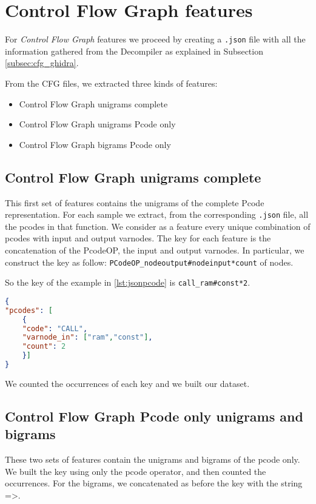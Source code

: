 \section{Control Flow Graph features}
For \textit{Control Flow Graph} features we proceed by creating a \texttt{.json} file with all the information gathered from the Decompiler as explained in Subsection \ref{subsec:cfg_ghidra}.

From the CFG files, we extracted three kinds of features:
\begin{itemize}
	\item {Control Flow Graph unigrams complete}
	\item {Control Flow Graph unigrams Pcode only}
	\item {Control Flow Graph bigrams Pcode only}
\end{itemize}

\subsection{Control Flow Graph unigrams complete}
This first set of features contains the unigrams of the complete Pcode representation.
For each sample we extract, from the corresponding \texttt{.json} file, all the pcodes in that function. We consider as a feature every unique combination of pcodes with input and output varnodes.
The key for each feature is the concatenation of the PcodeOP, the input and output varnodes. In particular, we construct the key as follow:
\texttt{PCodeOP\_nodeoutput\#nodeinput*count} of nodes.

So the key of the example in \ref{lst:jsonpcode} is \texttt{call\_ram\#const*2}.

\clearpage
\begin{lstlisting}[language=json,firstnumber=1,caption={Example of .json format with PCode},label={lst:jsonpcode}]
{
"pcodes": [
	{
	"code": "CALL",
	"varnode_in": ["ram","const"],
	"count": 2 
	}]
}
\end{lstlisting}

We counted the occurrences of each key and we built our dataset.

\subsection{Control Flow Graph Pcode only unigrams and bigrams}

These two sets of features contain the unigrams and bigrams of the pcode only. We built the key using only the pcode operator, and then counted the occurrences. For the bigrams, we concatenated as before the key with the string =>.

